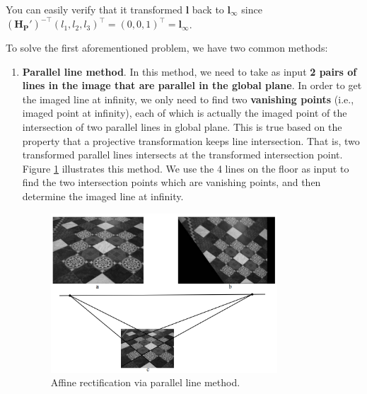 \documentclass[12pt]{article}
\numberwithin{equation}{section}
\begin{document}
You can easily verify that it transformed $\mathbf{l}$ back to $\mathbf{l}_{\infty}$ since $(\mathbf{H_P}')^{-\top} (l_1, l_2, l_3)^\top = (0, 0, 1)^\top = \mathbf{l}_{\infty}$. 

To solve the first aforementioned problem, we have two common methods:
\begin{enumerate}
\item \textbf{Parallel line method}. In this method, we need to take as input \textbf{2 pairs of lines in the image that are parallel in the global plane}. In order to get the imaged line at infinity, we only need to find two \textbf{vanishing points} (i.e., imaged point at infinity), each of which is actually the imaged point of the intersection of two parallel lines in global plane. This is true based on the property that a projective transformation keeps line intersection. That is, two transformed parallel lines intersects at the transformed intersection point. Figure \ref{fig:affine_rect_parallelline} illustrates this method. We use the 4 lines on the floor as input to find the two intersection points which are vanishing points, and then determine the imaged line at infinity.

\begin{figure}[h]
\begin{center}
\includegraphics[width=0.8\textwidth]{affine_rect02.png}
\end{center}
\caption{Affine rectification via parallel line method.}
\label{fig:affine_rect_parallelline}
\end{figure}


\end{enumerate}
\end{document}

